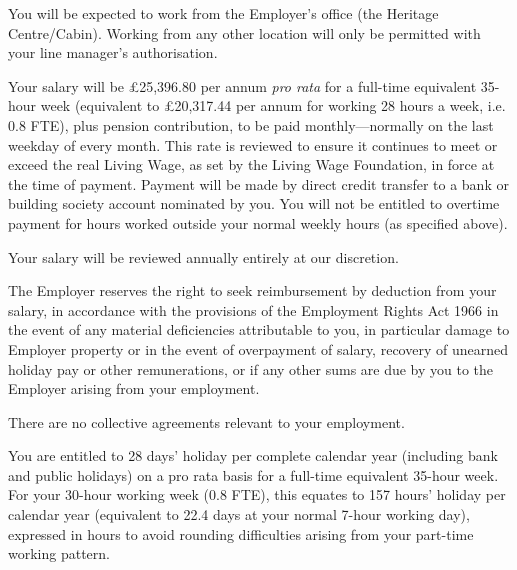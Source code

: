 \documentclass[a4paper,11pt,onecolumn ]{article}
\begin{document}
\begin{legal}
\item {}
You will be expected to work from the Employer's office (the Heritage Centre/Cabin). Working
from any other location will only be permitted with your line manager's authorisation.

\item {}
\begin{legal}
\item Your salary will be £25,396.80 per annum \textit{pro rata} for a full-time equivalent
35-hour week (equivalent to £20,317.44 per annum for working 28 hours a week, i.e. 0.8 FTE),
plus pension contribution, to be paid monthly---normally on the last weekday of every month.
This rate is reviewed to ensure it continues to meet or exceed the real Living Wage, as set by 
the Living Wage Foundation, in force at the time of payment. Payment will be made by direct credit transfer 
to a bank or building society account nominated by you. You will not be entitled to overtime
payment for hours worked outside your normal weekly hours (as specified above).
\item Your salary will be reviewed annually entirely at our discretion.
\item The Employer reserves the right to seek reimbursement by deduction from your
salary, in accordance with the provisions of the Employment Rights Act 1966 in
the event of any material deficiencies attributable to you, in particular damage
to Employer property or in the event of overpayment of salary, recovery of
unearned holiday pay or other remunerations, or if any other sums are due by
you to the Employer arising from your employment.
\end{legal}


\item {}
There are no collective agreements relevant to your employment.

\item {}
\begin{legal}
\item You are entitled to 28 days’ holiday per complete calendar year (including bank and 
public holidays) on a pro rata basis for a full-time equivalent 35-hour week. For your 
30-hour working week (0.8 FTE), this equates to 157 hours’ holiday per calendar year
(equivalent to 22.4 days at your normal 7-hour working day), expressed in hours to
avoid rounding difficulties arising from your part-time working pattern.


\end{legal}
\end{legal}
\end{document}
